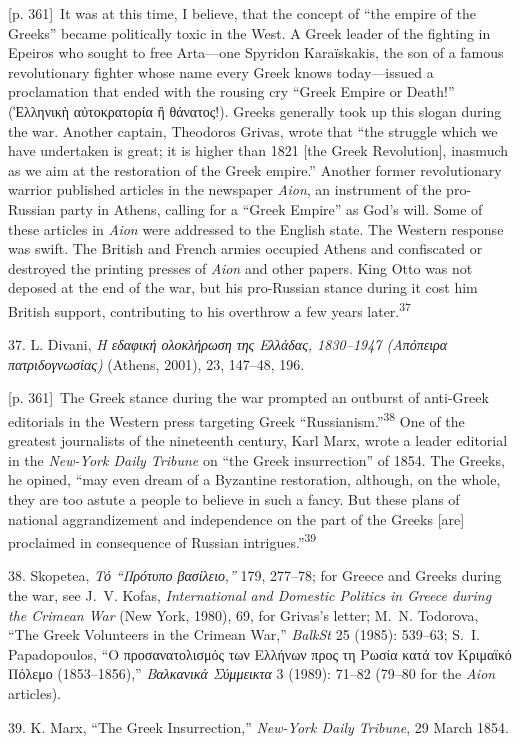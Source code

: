 \documentclass[10pt,a4paper]{article}
\begin{document}
{\scriptsize\color{gray}[p. 361]}\ It was at this time, I believe, that the concept of “the empire of the Greeks” became politically toxic in the West. A Greek leader of the fighting in Epeiros who sought to free Arta—one Spyridon Karaïskakis, the son of a famous revolutionary fighter whose name every Greek knows today—issued a proclamation that ended with the rousing cry “Greek Empire or Death!” (Ἑλληνικὴ αὐτοκρατορία ἢ θάνατος!). Greeks generally took up this slogan during the war. Another captain, Theodoros Grivas, wrote that “the struggle which we have undertaken is great; it is higher than 1821 [the Greek Revolution], inasmuch as we aim at the restoration of the Greek empire.” Another former revolutionary warrior published articles in the newspaper \textit{Aion}, an instrument of the pro-Russian party in Athens, calling for a “Greek Empire” as God’s will. Some of these articles in \textit{Aion} were addressed to the English state. The Western response was swift. The British and French armies occupied Athens and confiscated or destroyed the printing presses of \textit{Aion} and other papers. King Otto was not deposed at the end of the war, but his pro-Russian stance during it cost him British support, contributing to his overthrow a few years later.\nobreak\textsuperscript{37}\par{\small 37. L. Divani, \textit{Η εδαφική ολοκλήρωση της Ελλάδας, 1830–1947 (Απόπειρα πατριδογνωσίας)} (Athens, 2001), 23, 147–48, 196.\par}
{\scriptsize\color{gray}[p. 361]}\ The Greek stance during the war prompted an outburst of anti-Greek editorials in the Western press targeting Greek “Russianism.”\nobreak\textsuperscript{38} One of the greatest journalists of the nineteenth century, Karl Marx, wrote a leader editorial in the \textit{New-York Daily Tribune} on “the Greek insurrection” of 1854. The Greeks, he opined, “may even dream of a Byzantine restoration, although, on the whole, they are too astute a people to believe in such a fancy. But these plans of national aggrandizement and independence on the part of the Greeks [are] proclaimed in consequence of Russian intrigues.”\nobreak\textsuperscript{39}\par{\small 38. Skopetea, \textit{Τό “Πρότυπο βασίλειο},\textit{”} 179, 277–78; for Greece and Greeks during the war, see J. V. Kofas, \textit{International and Domestic Politics in Greece during the Crimean War} (New York, 1980), 69, for Grivas’s letter; M. N. Todorova, “The Greek Volunteers in the Crimean War,” \textit{BalkSt} 25 (1985): 539–63; S. I. Papadopoulos, “Ο προσανατολισμός των Ελλήνων προς τη Ρωσία κατά τον Κριμαϊκό Πόλεμο (1853–1856),” \textit{Βαλκανικά Σύμμεικτα} 3 (1989): 71–82 (79–80 for the \textit{Aion} articles).\par}{\small 39. K. Marx, “The Greek Insurrection,” \textit{New-York Daily Tribune},\textit{ }29 March 1854.\par}
\end{document}
